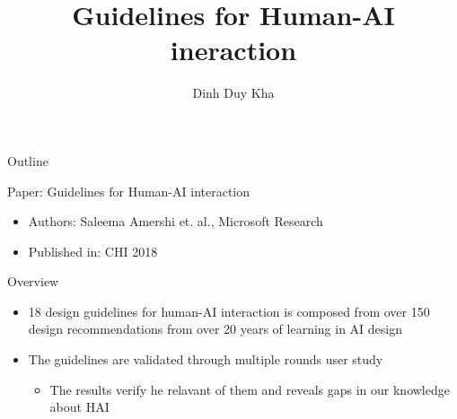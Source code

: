 \documentclass[presentation]{beamer}
\author{Dinh Duy Kha}
\date{}
\title{Guidelines for Human-AI ineraction}
\begin{document}
\maketitle
\begin{frame}{Outline}
\tableofcontents
\end{frame}


\begin{frame}[label={sec:org0dad90d}]{Paper: Guidelines for Human-AI interaction}
\begin{itemize}
\item Authors: Saleema Amershi et. al., Microsoft Research
\item Published in: CHI 2018
\end{itemize}
\begin{block}{Overview}
\begin{itemize}
\item 18 design guidelines for human-AI interaction is composed from over 150 design recommendations from over 20 years of learning in AI design
\item The guidelines are validated through multiple rounds user study
\begin{itemize}
\item The results verify he relavant of them and reveals gaps in our knowledge about HAI
\end{itemize}
\end{itemize}
\end{block}
\end{frame}
\end{document}

